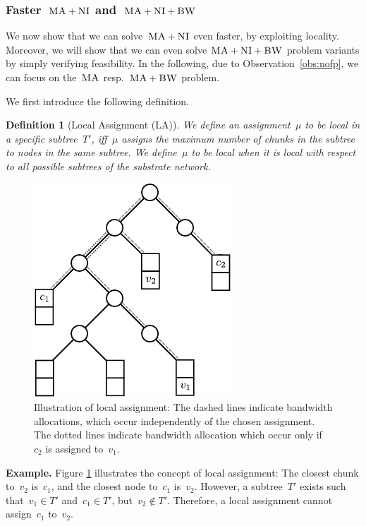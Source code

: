 \documentclass[preprint,12pt]{elsarticle}
\newcommand{\VmChunkAssignment}{\mu}
\newcommand{\CC}{\textsc{NI}}
\newcommand{\BW}{\textsc{BW}}
\newcommand{\MA}{\textsc{MA}}
\newtheorem{defn}{Definition}
\newcommand{\Tree}{\ensuremath{T}}
\begin{document}
\subsubsection{Faster~$\MA+\CC$ and~$\MA+\CC+\BW$}

We now show that we can solve~$\MA+\CC$ even faster, by exploiting
locality. Moreover, we will show that we can
even solve
$\MA+\CC+\BW$ problem variants by simply
verifying feasibility.
In the following, due to Observation~\ref{obs:nofp}, we can focus on
the~$\MA$ resp.~$\MA+\BW$ problem.

We first introduce the following definition.
\begin{defn}[Local Assignment (LA)]\label{def:loc}
We define an assignment~$\VmChunkAssignment$ to
be \emph{local in a specific subtree~$\Tree'$}, iff~$\VmChunkAssignment$
assigns the maximum number of chunks in the
subtree to nodes in the same subtree.
We define~$\VmChunkAssignment$ to be \emph{local} when
it is local with respect to all possible subtrees of the substrate network.
\end{defn}

\begin{figure}
\center
\includegraphics[width = 0.45\columnwidth]{figs/unbalanced_tree}
\caption{Illustration of local assignment: The dashed lines indicate bandwidth allocations, which occur
independently of the chosen assignment. The dotted lines indicate bandwidth
allocation which occur only if~$c_2$ is assigned to~$v_1$.}
\label{fig:unbalanced_tree}
\end{figure}

\textbf{Example.}
Figure \ref{fig:unbalanced_tree} illustrates the concept of local assignment:
The closest chunk to~$v_2$ is~$c_1$, and the closest node to~$c_1$ is~$v_2$.
However, a subtree~$T'$ exists such that~$v_1 \in T'$ and~$c_1
\in T'$, but~$v_2 \notin T'$. Therefore, a local assignment cannot assign~$c_1$ to~$v_2$.
\end{document}
